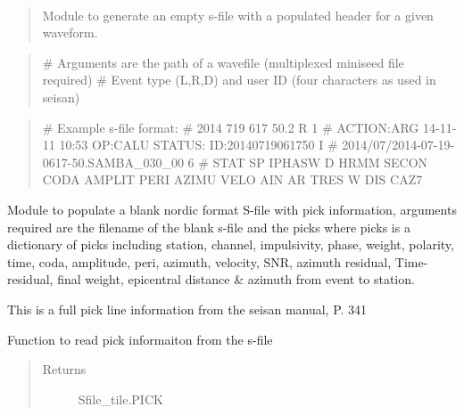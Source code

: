 \documentclass[a4paper,10pt,english]{sphinxmanual}
\begin{document}
\begin{fulllineitems}
\label{modules:Sfile_util.blanksfile}~\begin{quote}

Module to generate an empty s-file with a populated header for a given
waveform.
\end{quote}
\begin{quote}

\# Arguments are the path of a wavefile (multiplexed miniseed file required)
\# Event type (L,R,D) and user ID (four characters as used in seisan)
\end{quote}
\begin{quote}

\# Example s-file format:
\# 2014  719  617 50.2 R                                                         1
\# ACTION:ARG 14-11-11 10:53 OP:CALU STATUS:               ID:20140719061750     I
\# 2014/07/2014-07-19-0617-50.SAMBA\_030\_00                                       6
\# STAT SP IPHASW D HRMM SECON CODA AMPLIT PERI AZIMU VELO AIN AR TRES W  DIS CAZ7
\end{quote}

\end{fulllineitems}


\begin{fulllineitems}
\label{modules:Sfile_util.populateSfile}
Module to populate a blank nordic format S-file with pick information,
arguments required are the filename of the blank s-file and the picks
where picks is a dictionary of picks including station, channel,
impulsivity, phase, weight, polarity, time, coda, amplitude, peri, azimuth,
velocity, SNR, azimuth residual, Time-residual, final weight,
epicentral distance \& azimuth from event to station.

This is a full pick line information from the seisan manual, P. 341

\end{fulllineitems}


\begin{fulllineitems}
\label{modules:Sfile_util.readpicks}
Function to read pick informaiton from the s-file
\begin{quote}\begin{description}
\item[{Returns}] \leavevmode
Sfile\_tile.PICK

\end{description}\end{quote}

\end{fulllineitems}
\end{document}
